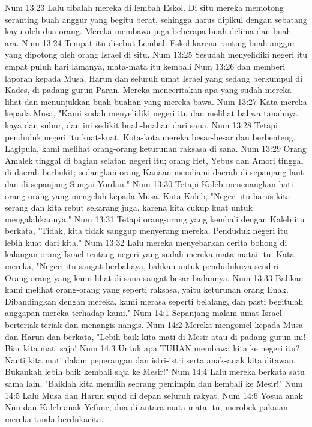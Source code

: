 Num 13:23  Lalu tibalah mereka di lembah Eskol. Di situ mereka memotong seranting buah anggur yang begitu berat, sehingga harus dipikul dengan sebatang kayu oleh dua orang. Mereka membawa juga beberapa buah delima dan buah ara.
Num 13:24  Tempat itu disebut Lembah Eskol karena ranting buah anggur yang dipotong oleh orang Israel di situ.
Num 13:25  Sesudah menyelidiki negeri itu empat puluh hari lamanya, mata-mata itu kembali
Num 13:26  dan memberi laporan kepada Musa, Harun dan seluruh umat Israel yang sedang berkumpul di Kades, di padang gurun Paran. Mereka menceritakan apa yang sudah mereka lihat dan menunjukkan buah-buahan yang mereka bawa.
Num 13:27  Kata mereka kepada Musa, "Kami sudah menyelidiki negeri itu dan melihat bahwa tanahnya kaya dan subur, dan ini sedikit buah-buahan dari sana.
Num 13:28  Tetapi penduduk negeri itu kuat-kuat. Kota-kota mereka besar-besar dan berbenteng. Lagipula, kami melihat orang-orang keturunan raksasa di sana.
Num 13:29  Orang Amalek tinggal di bagian selatan negeri itu; orang Het, Yebus dan Amori tinggal di daerah berbukit; sedangkan orang Kanaan mendiami daerah di sepanjang laut dan di sepanjang Sungai Yordan."
Num 13:30  Tetapi Kaleb menenangkan hati orang-orang yang mengeluh kepada Musa. Kata Kaleb, "Negeri itu harus kita serang dan kita rebut sekarang juga, karena kita cukup kuat untuk mengalahkannya."
Num 13:31  Tetapi orang-orang yang kembali dengan Kaleb itu berkata, "Tidak, kita tidak sanggup menyerang mereka. Penduduk negeri itu lebih kuat dari kita."
Num 13:32  Lalu mereka menyebarkan cerita bohong di kalangan orang Israel tentang negeri yang sudah mereka mata-matai itu. Kata mereka, "Negeri itu sangat berbahaya, bahkan untuk penduduknya sendiri. Orang-orang yang kami lihat di sana sangat besar badannya.
Num 13:33  Bahkan kami melihat orang-orang yang seperti raksasa, yaitu keturunan orang Enak. Dibandingkan dengan mereka, kami merasa seperti belalang, dan pasti begitulah anggapan mereka terhadap kami."
Num 14:1  Sepanjang malam umat Israel berteriak-teriak dan menangis-nangis.
Num 14:2  Mereka mengomel kepada Musa dan Harun dan berkata, "Lebih baik kita mati di Mesir atau di padang gurun ini! Biar kita mati saja!
Num 14:3  Untuk apa TUHAN membawa kita ke negeri itu? Nanti kita mati dalam peperangan dan istri-istri serta anak-anak kita ditawan. Bukankah lebih baik kembali saja ke Mesir!"
Num 14:4  Lalu mereka berkata satu sama lain, "Baiklah kita memilih seorang pemimpin dan kembali ke Mesir!"
Num 14:5  Lalu Musa dan Harun sujud di depan seluruh rakyat.
Num 14:6  Yosua anak Nun dan Kaleb anak Yefune, dua di antara mata-mata itu, merobek pakaian mereka tanda berdukacita.
